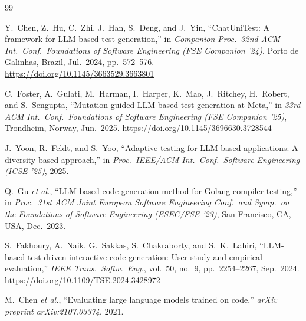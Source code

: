 \documentclass[12pt, a4paper]{article}
\begin{document}

% 

\begin{thebibliography}{99}

Y.~Chen, Z.~Hu, C.~Zhi, J.~Han, S.~Deng, and J.~Yin,
``ChatUniTest: A framework for LLM-based test generation,''
in \textit{Companion Proc.\ 32nd ACM Int.\ Conf.\ Foundations of Software Engineering (FSE Companion '24)},
Porto de Galinhas, Brazil, Jul.\ 2024, pp.\ 572--576.
\url{https://doi.org/10.1145/3663529.3663801}

C.~Foster, A.~Gulati, M.~Harman, I.~Harper, K.~Mao, J.~Ritchey, H.~Robert, and S.~Sengupta,
``Mutation-guided LLM-based test generation at Meta,''
in \textit{33rd ACM Int.\ Conf.\ Foundations of Software Engineering (FSE Companion '25)},
Trondheim, Norway, Jun.\ 2025.
\url{https://doi.org/10.1145/3696630.3728544}

J.~Yoon, R.~Feldt, and S.~Yoo,
``Adaptive testing for LLM-based applications: A diversity-based approach,''
in \textit{Proc.\ IEEE/ACM Int.\ Conf.\ Software Engineering (ICSE '25)},
2025.

Q.~Gu \textit{et al.},
``LLM-based code generation method for Golang compiler testing,''
in \textit{Proc.\ 31st ACM Joint European Software Engineering Conf.\ and Symp.\ on the Foundations of Software Engineering (ESEC/FSE '23)},
San Francisco, CA, USA, Dec.\ 2023.

S.~Fakhoury, A.~Naik, G.~Sakkas, S.~Chakraborty, and S.~K.~Lahiri,
``LLM-based test-driven interactive code generation: User study and empirical evaluation,''
\textit{IEEE Trans.\ Softw.\ Eng.}, vol.~50, no.~9, pp.\ 2254--2267, Sep.\ 2024.
\url{https://doi.org/10.1109/TSE.2024.3428972}

M.~Chen \textit{et al.},
``Evaluating large language models trained on code,''
\textit{arXiv preprint arXiv:2107.03374}, 2021.

\end{thebibliography}

\end{document}
